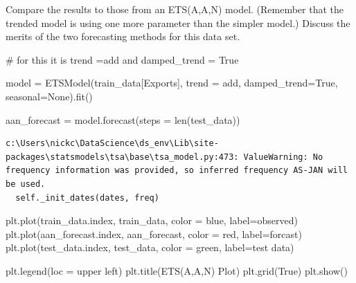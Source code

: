 \documentclass[
  11pt,
]{article}
\newenvironment{Shaded}{\begin{snugshade}}{\end{snugshade}}
\newcommand{\BuiltInTok}[1]{\textcolor[rgb]{0.00,0.23,0.31}{#1}}
\newcommand{\CommentTok}[1]{\textcolor[rgb]{0.37,0.37,0.37}{#1}}
\newcommand{\NormalTok}[1]{\textcolor[rgb]{0.00,0.23,0.31}{#1}}
\newcommand{\OperatorTok}[1]{\textcolor[rgb]{0.37,0.37,0.37}{#1}}
\newcommand{\StringTok}[1]{\textcolor[rgb]{0.13,0.47,0.30}{#1}}
\newcommand{\VariableTok}[1]{\textcolor[rgb]{0.07,0.07,0.07}{#1}}
\begin{document}
Compare the results to those from an ETS(A,A,N) model. (Remember that
the trended model is using one more parameter than the simpler model.)
Discuss the merits of the two forecasting methods for this data set.

\begin{Shaded}
\begin{Highlighting}[]
\CommentTok{\# for this it is trend =\textquotesingle{}add\textquotesingle{} and damped\_trend = True}

\NormalTok{model }\OperatorTok{=}\NormalTok{ ETSModel(train\_data[}\StringTok{\textquotesingle{}Exports\textquotesingle{}}\NormalTok{], trend }\OperatorTok{=} \StringTok{\textquotesingle{}add\textquotesingle{}}\NormalTok{, damped\_trend}\OperatorTok{=}\VariableTok{True}\NormalTok{, seasonal}\OperatorTok{=}\VariableTok{None}\NormalTok{).fit()}

\NormalTok{aan\_forecast }\OperatorTok{=}\NormalTok{ model.forecast(steps }\OperatorTok{=} \BuiltInTok{len}\NormalTok{(test\_data))}
\end{Highlighting}
\end{Shaded}

\begin{verbatim}
c:\Users\nickc\DataScience\ds_env\Lib\site-packages\statsmodels\tsa\base\tsa_model.py:473: ValueWarning: No frequency information was provided, so inferred frequency AS-JAN will be used.
  self._init_dates(dates, freq)
\end{verbatim}

\begin{Shaded}
\begin{Highlighting}[]
\NormalTok{plt.plot(train\_data.index, train\_data, color }\OperatorTok{=} \StringTok{\textquotesingle{}blue\textquotesingle{}}\NormalTok{, label}\OperatorTok{=}\StringTok{\textquotesingle{}observed\textquotesingle{}}\NormalTok{)}
\NormalTok{plt.plot(aan\_forecast.index, aan\_forecast, color }\OperatorTok{=} \StringTok{\textquotesingle{}red\textquotesingle{}}\NormalTok{, label}\OperatorTok{=}\StringTok{\textquotesingle{}forcast\textquotesingle{}}\NormalTok{)}
\NormalTok{plt.plot(test\_data.index, test\_data, color }\OperatorTok{=} \StringTok{\textquotesingle{}green\textquotesingle{}}\NormalTok{, label}\OperatorTok{=}\StringTok{\textquotesingle{}test data\textquotesingle{}}\NormalTok{)}

\NormalTok{plt.legend(loc }\OperatorTok{=} \StringTok{\textquotesingle{}upper left\textquotesingle{}}\NormalTok{)}
\NormalTok{plt.title(}\StringTok{\textquotesingle{}ETS(A,A,N) Plot\textquotesingle{}}\NormalTok{)}
\NormalTok{plt.grid(}\VariableTok{True}\NormalTok{)}
\NormalTok{plt.show()}
\end{Highlighting}
\end{Shaded}
\end{document}
